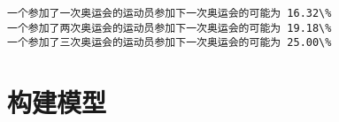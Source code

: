 \documentclass[11pt]{article}
\begin{document}
    \begin{Verbatim}[commandchars=\\\{\}]
一个参加了一次奥运会的运动员参加下一次奥运会的可能为 16.32\%
一个参加了两次奥运会的运动员参加下一次奥运会的可能为 19.18\%
一个参加了三次奥运会的运动员参加下一次奥运会的可能为 25.00\%
    \end{Verbatim}

    \section{构建模型}\label{ux6784ux5efaux6a21ux578b}


    
    
    
\end{document}
